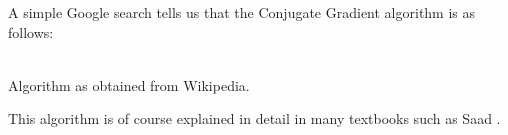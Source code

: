 A simple Google search tells us that the Conjugate Gradient algorithm is as follows:
\begin{center}
\\
{\captionfont Algorithm as obtained from Wikipedia.}
\end{center}
This algorithm is of course explained in detail in many textbooks such as Saad \cite{saad}.

